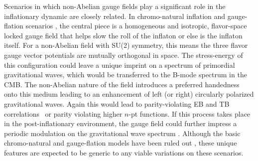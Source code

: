 Scenarios in which non-Abelian gauge fields play a significant role in the inflationary dynamic are closely related. In chromo-natural inflation and gauge-flation scenarios \cite{Maleknejad:2011jw,Adshead:2012kp,Adshead:2012qe,Adshead:2013qp,Adshead:2013nka,Dimastrogiovanni:2012st,Dimastrogiovanni:2012ew}, the central piece is a homogeneous and isotropic, flavor-space locked gauge field that helps slow the roll of the inflaton or else is the inflaton itself. For a non-Abelian field with SU(2) symmetry, this means the three flavor gauge vector potentials are mutually orthogonal in space. The stress-energy of this configuration could leave a unique imprint on a spectrum of primordial gravitational waves, which would be transferred to the B-mode spectrum in the CMB. The non-Abelian nature of the field introduces a preferred handedness onto this medium leading to an enhancement of left (or right) circularly polarized gravitational waves. Again this would lead to parity-violating EB and TB correlations~\cite{Lue:1998mq,Gluscevic:2010vv} or parity violating higher $n$-pt functions. If this process takes place in the post-inflationary environment, the gauge field could further impress a periodic modulation on the gravitational wave spectrum \cite{Bielefeld:2014nza,Bielefeld:2015daa}. Although the basic chromo-natural and gauge-flation models have been ruled out \cite{Namba:2013kia}, these unique features are expected to be generic to any viable variations on these scenarios.

